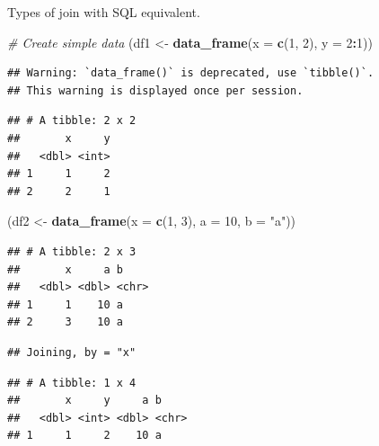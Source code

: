 \documentclass[]{book}
\newenvironment{Shaded}{\begin{snugshade}}{\end{snugshade}}
\newcommand{\KeywordTok}[1]{\textcolor[rgb]{0.13,0.29,0.53}{\textbf{#1}}}
\newcommand{\DataTypeTok}[1]{\textcolor[rgb]{0.13,0.29,0.53}{#1}}
\newcommand{\DecValTok}[1]{\textcolor[rgb]{0.00,0.00,0.81}{#1}}
\newcommand{\StringTok}[1]{\textcolor[rgb]{0.31,0.60,0.02}{#1}}
\newcommand{\CommentTok}[1]{\textcolor[rgb]{0.56,0.35,0.01}{\textit{#1}}}
\newcommand{\OperatorTok}[1]{\textcolor[rgb]{0.81,0.36,0.00}{\textbf{#1}}}
\newcommand{\NormalTok}[1]{#1}
\theoremstyle{definition}
\theoremstyle{definition}
\theoremstyle{definition}
\theoremstyle{remark}
\begin{document}
Types of join with SQL equivalent.

\begin{Shaded}
\begin{Highlighting}[]
\CommentTok{# Create simple data}
\NormalTok{(df1 <-}\StringTok{ }\KeywordTok{data_frame}\NormalTok{(}\DataTypeTok{x =} \KeywordTok{c}\NormalTok{(}\DecValTok{1}\NormalTok{, }\DecValTok{2}\NormalTok{), }\DataTypeTok{y =} \DecValTok{2}\OperatorTok{:}\DecValTok{1}\NormalTok{))}
\end{Highlighting}
\end{Shaded}

\begin{verbatim}
## Warning: `data_frame()` is deprecated, use `tibble()`.
## This warning is displayed once per session.
\end{verbatim}

\begin{verbatim}
## # A tibble: 2 x 2
##       x     y
##   <dbl> <int>
## 1     1     2
## 2     2     1
\end{verbatim}

\begin{Shaded}
\begin{Highlighting}[]
\NormalTok{(df2 <-}\StringTok{ }\KeywordTok{data_frame}\NormalTok{(}\DataTypeTok{x =} \KeywordTok{c}\NormalTok{(}\DecValTok{1}\NormalTok{, }\DecValTok{3}\NormalTok{), }\DataTypeTok{a =} \DecValTok{10}\NormalTok{, }\DataTypeTok{b =} \StringTok{"a"}\NormalTok{))}
\end{Highlighting}
\end{Shaded}

\begin{verbatim}
## # A tibble: 2 x 3
##       x     a b    
##   <dbl> <dbl> <chr>
## 1     1    10 a    
## 2     3    10 a
\end{verbatim}

\begin{Shaded}
\end{Shaded}

\begin{verbatim}
## Joining, by = "x"
\end{verbatim}

\begin{verbatim}
## # A tibble: 1 x 4
##       x     y     a b    
##   <dbl> <int> <dbl> <chr>
## 1     1     2    10 a
\end{verbatim}
\end{document}
